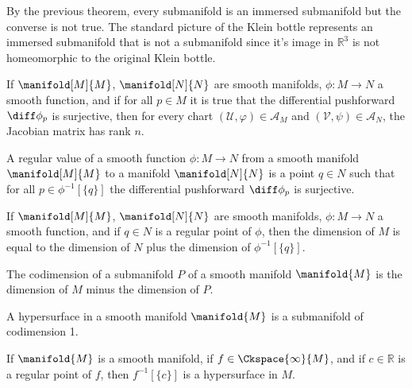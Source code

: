 \documentclass{article}                                                        %
\begin{document}
            By the previous theorem, every submanifold is an immersed
            submanifold but the converse is not true. The standard picture of
            the Klein bottle represents an immersed submanifold that is not a
            submanifold since it's image in $\mathbb{R}^{3}$ is not homeomorphic
            to the original Klein bottle.
            \begin{theorem}
                If $\manifold[M]{M}$, $\manifold[N]{N}$ are smooth manifolds,
                $\phi:M\rightarrow{N}$ a smooth function, and if for all
                $p\in{M}$ it is true that the differential pushforward
                $\diff\phi_{p}$ is surjective, then for every chart
                $(\mathcal{U},\varphi)\in\mathcal{A}_{M}$ and
                $(\mathcal{V},\psi)\in\mathcal{A}_{N}$, the Jacobian matrix has
                rank $n$.
            \end{theorem}
            \begin{definition}
                A regular value of a smooth function $\phi:M\rightarrow{N}$ from
                a smooth manifold $\manifold[M]{M}$ to a manifold
                $\manifold[N]{N}$ is a point $q\in{N}$ such that for all
                $p\in\phi^{\minus{1}}[\{q\}]$ the differential pushforward
                $\diff\phi_{p}$ is surjective.
            \end{definition}
            \begin{theorem}
                If $\manifold[M]{M}$, $\manifold[N]{N}$ are smooth manifolds,
                $\phi:M\rightarrow{N}$ a smooth function, and if $q\in{N}$ is a
                regular point of $\phi$, then the dimension of $M$ is equal to
                the dimension of $N$ plus the dimension of
                $\phi^{\minus{1}}[\{q\}]$.
            \end{theorem}
            \begin{definition}
                The codimension of a submanifold $P$ of a smooth manifold
                $\manifold{M}$ is the dimension of $M$ minus the dimension of
                $P$.
            \end{definition}
            \begin{definition}
                A hypersurface in a smooth manifold $\manifold{M}$ is a
                submanifold of codimension 1.
            \end{definition}
            \begin{theorem}
                If $\manifold{M}$ is a smooth manifold, if
                $f\in\Ckspace{\infty}{M}$, and if $c\in\mathbb{R}$ is a regular
                point of $f$, then $f^{\minus{1}}[\{c\}]$ is a hypersurface in
                $M$.
            \end{theorem}
\end{document}
